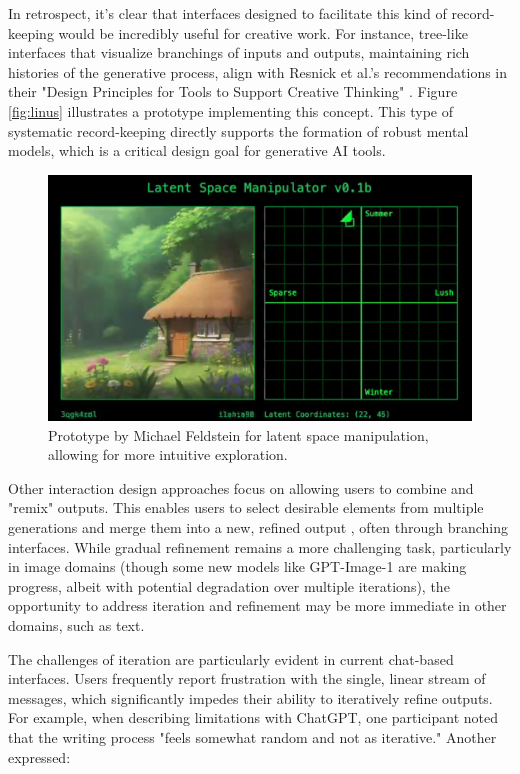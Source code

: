 In retrospect, it's clear that interfaces designed to facilitate this kind of record-keeping would be incredibly useful for creative work. For instance, tree-like interfaces that visualize branchings of inputs and outputs, maintaining rich histories of the generative process, align with Resnick et al.'s recommendations in their "Design Principles for Tools to Support Creative Thinking" \cite{Resnick2005-fs}. Figure \ref{fig:linus} illustrates a prototype implementing this concept. This type of systematic record-keeping directly supports the formation of robust mental models, which is a critical design goal for generative AI tools.

\begin{figure}[H]
    \centering
    \includegraphics[width=0.8\linewidth]{latentspacemanip.png}
    \caption{Prototype by Michael Feldstein for latent space manipulation, allowing for more intuitive exploration.}
    \label{fig:feldstein}
\end{figure}

Other interaction design approaches focus on allowing users to combine and "remix" outputs. This enables users to select desirable elements from multiple generations and merge them into a new, refined output \cite{Zhou2024-vp}, often through branching interfaces. While gradual refinement remains a more challenging task, particularly in image domains (though some new models like GPT-Image-1 are making progress, albeit with potential degradation over multiple iterations), the opportunity to address iteration and refinement may be more immediate in other domains, such as text.

The challenges of iteration are particularly evident in current chat-based interfaces. Users frequently report frustration with the single, linear stream of messages, which significantly impedes their ability to iteratively refine outputs. For example, when describing limitations with ChatGPT, one participant noted that the writing process "feels somewhat random and not as iterative." Another expressed:

